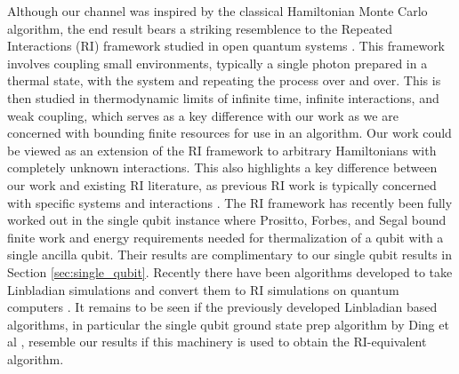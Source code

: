 Although our channel was inspired by the classical Hamiltonian Monte Carlo algorithm, the end result bears a striking resemblence to the Repeated Interactions (RI) framework studied in open quantum systems \cite{ciccarello2022repeated}. This framework involves coupling small environments, typically a single photon prepared in a thermal state, with the system and repeating the process over and over. This is then studied in thermodynamic limits of infinite time, infinite interactions, and weak coupling, which serves as a key difference with our work as we are concerned with bounding finite resources for use in an algorithm. Our work could be viewed as an extension of the RI framework to arbitrary Hamiltonians with completely unknown interactions. This also highlights a key difference between our work and existing RI literature, as previous RI work is typically concerned with specific systems and interactions \cite{polla2021quantum}. The RI framework has recently been fully worked out in the single qubit instance \cite{prositto2025equilibrium} where Prositto, Forbes, and Segal bound finite work and energy requirements needed for thermalization of a qubit with a single ancilla qubit. Their results are complimentary to our single qubit results in Section \ref{sec:single_qubit}. Recently there have been algorithms developed to take Linbladian simulations and convert them to RI simulations on quantum computers \cite{pocrnic2024quantumsimulationlindbladiandynamics}. It remains to be seen if the previously developed Linbladian based algorithms, in particular the single qubit ground state prep algorithm by Ding et al \cite{ding2024single}, resemble our results if this machinery is used to obtain the RI-equivalent algorithm.

